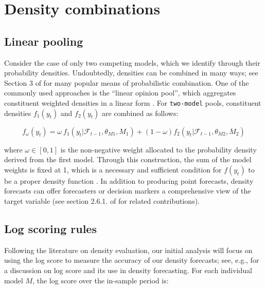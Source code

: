 \documentclass{monashthesis}
\begin{document}
\hypertarget{density-combinations}{%
\section{Density combinations}\label{density-combinations}}

\hypertarget{linear-pooling}{%
\subsection{Linear pooling}\label{linear-pooling}}

Consider the case of only two competing models, which we identify through their probability densities. Undoubtedly, densities can be combined in many ways; see Section 3 of \textcite{WHLK22} for many popular means of probabilistic combination. One of the commonly used approaches is the ``linear opinion pool'', which aggregates constituent weighted densities in a linear form \autocites[e.g.,][]{BG69,HM07,GA11}. For \texttt{two-model} pools, constituent densities \(f_1(y_t)\) and \(f_2(y_t)\) are combined as follows:

\begin{equation}
\label{eqn:LC1}
f_{\omega}(y_t) = \omega \ f_1(y_t | \mathcal{F}_{t-1}, \theta_{M1}, M_1) + (1-\omega) f_2(y_t | \mathcal{F}_{t-1}, \theta_{M2}, M_2)
\end{equation}

where \(\omega \in [0,1]\) is the non-negative weight allocated to the probability density derived from the first model. Through this construction, the sum of the model weights is fixed at 1, which is a necessary and sufficient condition for \(f(y_t)\) to be a proper density function \autocite{GA11}. In addition to producing point forecasts, density forecasts can offer forecasters or decision markers a comprehensive view of the target variable (see section 2.6.1. of \textcite{FTP22} for related contributions).

\hypertarget{log-scoring-rules}{%
\subsection{Log scoring rules}\label{log-scoring-rules}}

Following the literature on density evaluation, our initial analysis will focus on using the log score to measure the accuracy of our density forecasts; see, e.g., \textcite{GA11} for a discussion on log score and its use in density forecasting. For each individual model \(M\), the log score over the in-sample period is:
\end{document}
